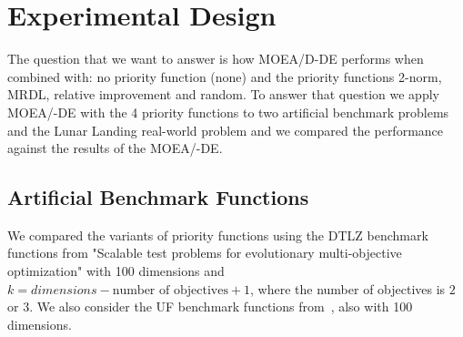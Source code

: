 \section{Experimental Design}

%


The question that we want to answer is how MOEA/D-DE performs when combined with: no priority function (none) and the priority functions 2-norm, MRDL, relative improvement and random. To answer that question we apply MOEA/-DE with the 4 priority functions to two artificial benchmark problems and the Lunar Landing real-world problem and we compared the performance against the results of the MOEA/-DE.

\subsection{Artificial Benchmark Functions}

We compared the variants of priority functions using the DTLZ benchmark functions from "Scalable test problems for evolutionary multi-objective optimization" with 100 dimensions and $k = dimensions - \text{number of objectives} + 1$, where the number of objectives is $2$ or $3$. We also consider the UF benchmark functions from~\cite{zhang2008multiobjective}, also with 100 dimensions. 

